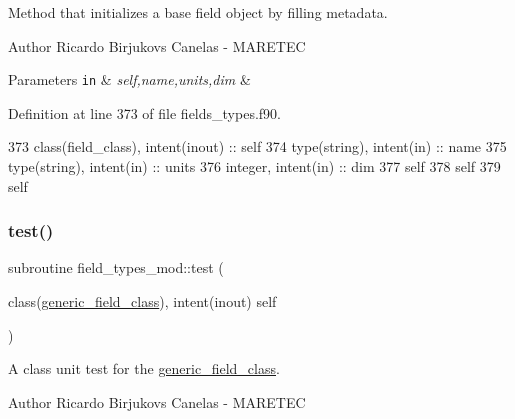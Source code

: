 Method that initializes a base field object by filling metadata. 

\begin{DoxyAuthor}{Author}
Ricardo Birjukovs Canelas -\/ M\+A\+R\+E\+T\+EC 
\end{DoxyAuthor}

\begin{DoxyParams}[1]{Parameters}
\mbox{\tt in}  & {\em self,name,units,dim} & \\
\hline
\end{DoxyParams}


Definition at line 373 of file fields\+\_\+types.\+f90.


\begin{DoxyCode}
373     \textcolor{keywordtype}{class}(field\_class), \textcolor{keywordtype}{intent(inout)} :: self
374     \textcolor{keywordtype}{type}(string), \textcolor{keywordtype}{intent(in)} :: name
375     \textcolor{keywordtype}{type}(string), \textcolor{keywordtype}{intent(in)} :: units
376     \textcolor{keywordtype}{integer}, \textcolor{keywordtype}{intent(in)} :: dim
377     self%
378     self%
379     self%
\end{DoxyCode}
\mbox{\label{namespacefield__types__mod_ad1448b34724138b4adf0d0abda0bb012}} 
\subsubsection{\texorpdfstring{test()}{test()}}
{\footnotesize\ttfamily subroutine field\+\_\+types\+\_\+mod\+::test (\begin{DoxyParamCaption}\item[{class(\mbox{\hyperlink{structfield__types__mod_1_1generic__field__class}{generic\+\_\+field\+\_\+class}}), intent(inout)}]{self }\end{DoxyParamCaption})\hspace{0.3cm}{\ttfamily [private]}}



A class \textquotesingle{}unit\textquotesingle{} test for the \mbox{\hyperlink{structfield__types__mod_1_1generic__field__class}{generic\+\_\+field\+\_\+class}}. 

\begin{DoxyAuthor}{Author}
Ricardo Birjukovs Canelas -\/ M\+A\+R\+E\+T\+EC 
\end{DoxyAuthor}


